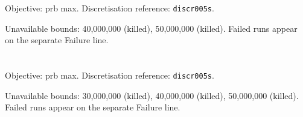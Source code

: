 \documentclass[a4paper,10pt]{article}
\begin{document}
\noindent\begin{minipage}{\linewidth}
\section*{\small\texttt{}}
Objective: prb max. Discretisation reference: \texttt{discr005s}.

\begin{minipage}[t]{0.48\linewidth}\centering

\end{minipage}
\hfill
\begin{minipage}[t]{0.48\linewidth}\centering

\end{minipage}
\par\medskip
Unavailable bounds: 40,000,000 (killed), 50,000,000 (killed). Failed runs appear on the separate Failure line.

\end{minipage}\par\bigskip
\noindent\begin{minipage}{\linewidth}
\section*{\small\texttt{}}
Objective: prb max. Discretisation reference: \texttt{discr005s}.

\begin{minipage}[t]{0.48\linewidth}\centering

\end{minipage}
\hfill
\begin{minipage}[t]{0.48\linewidth}\centering

\end{minipage}
\par\medskip
Unavailable bounds: 30,000,000 (killed), 40,000,000 (killed), 50,000,000 (killed). Failed runs appear on the separate Failure line.

\end{minipage}\par\bigskip
\end{document}
